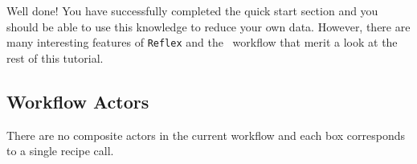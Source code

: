\documentclass[pdftex,a4paper,twoside,11pt]{article}
\begin{document}
Well done! You have successfully completed the quick start section and
you should be able to use this knowledge to reduce your own
data. However, there are many interesting features of {\tt Reflex} and
the \instname\, workflow that merit a look at the rest of this tutorial.







\subsection{Workflow Actors}

There are no composite actors in the current workflow
and each box corresponds to a single recipe call.








\end{document}
